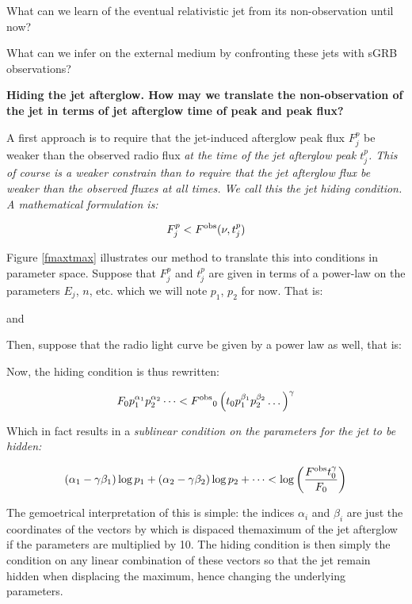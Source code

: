 What can we learn of the eventual relativistic jet from its non-observation until now?

What can we infer on the external medium by confronting these jets with sGRB observations?


\bf{Hiding the jet afterglow.} How may we translate the non-observation of the jet in terms of jet afterglow time of peak and peak flux?

A first approach is to require that the jet-induced afterglow peak flux $F_j^p$ be weaker than the observed radio flux \it{at the time of the jet afterglow peak} $t_j^p$. This of course is a weaker constrain than to require that the jet afterglow flux be \it{weaker than the observed fluxes at all times}. We call this the \it{jet hiding} condition. A mathematical formulation is:

$$F_j^p < F^{\rm{obs}}(\nu, t_j^p) $$

Figure \ref{fmaxtmax} illustrates our method to translate this into conditions in parameter space. Suppose that $F_j^p$ and $t_j^p$ are given in terms of a power-law on the parameters $E_j$, $n$, etc. which we will note $p_1$, $p_2$ for now. That is:


and


Then, suppose that the radio light curve be given by a power law as well, that is:

\cen{$\Fobs(\nu, \tobs) = \Fobs_0 \tobs^{\gamma}$}

Now, the hiding condition is thus rewritten:

$$F_0 p_1^{\alpha_1} p_2^{\alpha_2} \dots < \Fobs_0 \left( t_0 p_1^{\beta_1} p_2^{\beta_2} \dots \right)^{\gamma} $$

Which in fact results in a \it{sublinear condition} on the parameters for the jet to be hidden:

$$(\alpha_1 - \gamma \beta_1) \log p_1 + (\alpha_2 - \gamma \beta_2) \log p_2 + \dots < \log \left( \frac{\Fobs t_0 ^\gamma}{F_0} \right) $$

The gemoetrical interpretation of this is simple: the indices $\alpha_i$ and $\beta_i$ are just the coordinates of the vectors by which is dispaced themaximum of the jet afterglow if the parameters are multiplied by 10. The hiding condition is then simply the condition on any linear combination of these vectors so that the jet remain hidden when displacing the maximum, hence changing the underlying parameters.

